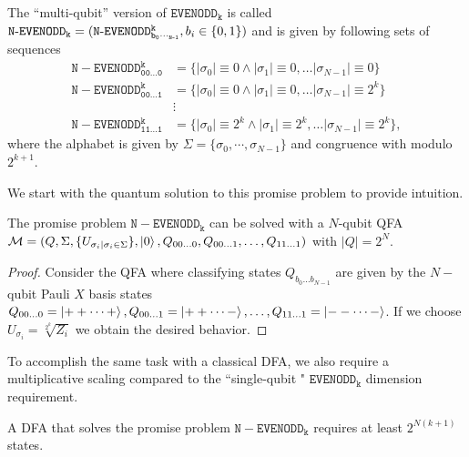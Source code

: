 \documentclass[../main.tex]{subfiles}
\begin{document}
\begin{definition}\label{def:neven}
    The ``multi-qubit'' version of $\mathtt{EVENODD_k}$ is called $\operatorname{\mathtt{N-EVENODD_k}}= \linebreak (\operatorname{\mathtt{N-EVENODD^k_{b_0\dotsb_{N-1}}}},b_i\in\{0,1\})$ and is given by following sets of sequences
    \begin{align}
        \operatorname{\mathtt{N-EVENODD^k_{00\dots0}}} &= \{ |\sigma_0| \equiv 0 \land  |\sigma_1| \equiv 0, \dots |\sigma_{N-1}| \equiv 0 \} \\
        \operatorname{\mathtt{N-EVENODD^k_{00\dots1}}} &= \{ |\sigma_0| \equiv 0 \land  |\sigma_1| \equiv 0, \dots |\sigma_{N-1}| \equiv 2^k \} \\
        &\vdots\\
        \operatorname{\mathtt{N-EVENODD^k_{11\dots1}}} &= \{ |\sigma_0| \equiv 2^k \land  |\sigma_1| \equiv 2^k, \dots |\sigma_{N-1}| \equiv 2^k \} ,
    \end{align}
    where the alphabet is given by $\Sigma = \{\sigma_0, \cdots, \sigma_{N-1} \}$ and congruence with modulo $2^{k+1}$.
\end{definition}

We start with the quantum solution to this promise problem to provide intuition.

\begin{theorem}
    The promise problem $\operatorname{\mathtt{N-EVENODD_k}}$ can be solved with a $N$-qubit QFA $\mathcal{M} = (Q, \Sigma, \{U_{\sigma_i|\sigma_i \in \Sigma}\}, \ket{0}, Q_{00\dots0},Q_{00\dots1},\dots,Q_{11\dots1})$ with $|Q| = 2^N$.
\end{theorem}
\begin{proof}
    Consider the QFA where classifying states $Q_{b_0\dots b_{N-1}}$ are given by the $N-$qubit Pauli $X$ basis states
    $Q_{00\dots0} = \ket{++\cdots+}, Q_{00\dots1} = \ket{++\cdots-},\dots,Q_{11\dots1} = \ket{--\cdots-}$.
    If we choose $U_{\sigma_i} = \sqrt[2^k]{Z_i}$ we obtain the desired behavior.  
\end{proof}

To accomplish the same task with a classical DFA, we also require a multiplicative scaling compared to the ``single-qubit  " $\mathtt{EVENODD_k}$ dimension requirement.

\begin{theorem}
    A DFA that solves the promise problem $\operatorname{\mathtt{N-EVENODD_k}}$ requires at least $2^{N(k+1)}$ states.
\end{theorem}
\end{document}
